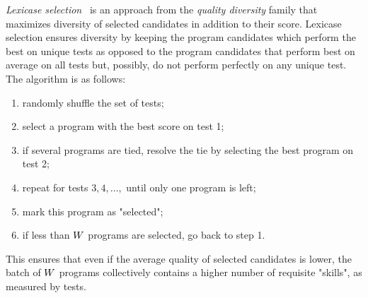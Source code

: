 \emph{Lexicase selection}~\cite{helmuth2015:solving} is an approach from the \emph{quality diversity} family that maximizes diversity of selected candidates in addition to their score.
Lexicase selection ensures diversity by keeping the program candidates which perform the best on unique tests as opposed to the program candidates that perform best on average on all tests but, possibly, do not perform perfectly on any unique test.
The algorithm is as follows:
\begin{enumerate}

\setlength{\parskip}{0pt}
\setlength\itemsep{0pt}

    \item randomly shuffle the set of tests;
    \item select a program with the best score on test 1;
    \item if several programs are tied, resolve the tie by selecting the best program on test 2;
    \item repeat for tests $3,4,\dots,$ until only one program is left;
    \item mark this program as "selected";
    \item if less than $W$ programs are selected, go back to step 1.
\end{enumerate}
This ensures that even if the average quality of selected candidates is lower, the batch of $W{}$ programs collectively contains a higher number of requisite "skills", as measured by tests.



